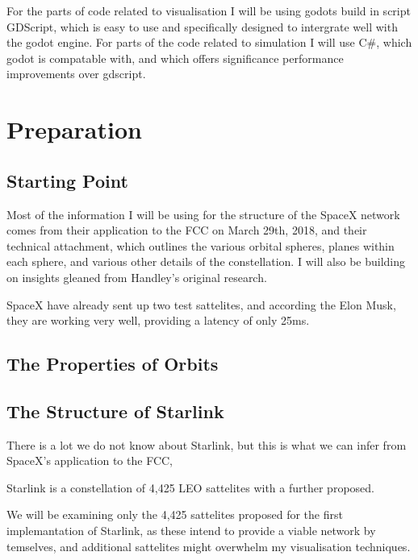 \documentclass[12pt]{article}
\begin{document}
For the parts of code related to visualisation I will be using godots build in script GDScript, which is easy to use and specifically designed to intergrate well with the godot engine. For parts of the code related to simulation I will use C\#, which godot is compatable with, and which offers significance performance improvements over gdscript.

\section{Preparation}




\subsection{Starting Point}

Most of the information I will be using for the structure of the SpaceX network comes from their application to the FCC on March 29th, 2018\cite{FCCApplication}, and their technical attachment\cite{TechnicalAttachment}, which outlines the various orbital spheres, planes within each sphere, and various other details of the constellation. I will also be building on insights gleaned from Handley's original research.


SpaceX have already sent up two test sattelites, and according the Elon Musk, they are working very well, providing a latency of only 25ms\cite{ElonMuskTweet}.


\subsection{The Properties of Orbits}


\subsection{The Structure of Starlink}

There is a lot we do not know about Starlink, but this is what we can infer from SpaceX’s application to the FCC\cite{FCCApplication}, 

Starlink is a constellation of 4,425 LEO sattelites with a further proposed. %

We will be examining only the 4,425 sattelites proposed for the first implemantation of Starlink, as these intend to provide a viable network by temselves, and additional sattelites might overwhelm my visualisation techniques. 
\end{document}
